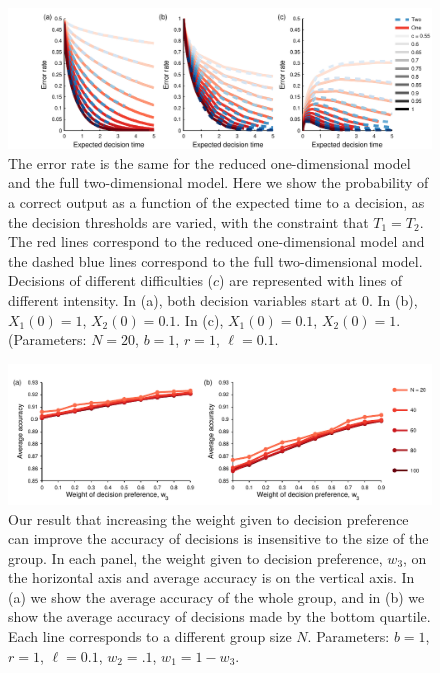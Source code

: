 \documentclass{article}
\begin{document}
\begin{figure}[ht]
\includegraphics[width=6.83in]{dimensionality_comparison.pdf}

\caption{\label{dimensionality} The error rate is the same for the reduced one-dimensional model and the full two-dimensional model. Here we show the probability of a correct output as a function of the expected time to a decision, as the decision thresholds are varied, with the constraint that $T_1=T_2$. The red lines correspond to the reduced one-dimensional model and the dashed blue lines correspond to the full two-dimensional model. Decisions of different difficulties ($c$) are represented with lines of different intensity. In (a), both decision variables start at $0$. In (b), $X_1(0)=1$, $X_2(0)=0.1$. In (c), $X_1(0)=0.1$, $X_2(0)=1$.  (Parameters: $N=20$, $b=1$, $r=1$, $\ell=0.1$.}
\end{figure}

\begin{figure}[ht]
\includegraphics[width=6.83in]{group_size.pdf}
\caption{\label{groupsize} Our result that increasing the weight given to decision preference can improve the accuracy of decisions is insensitive to the size of the group.  In each panel, the weight given to decision preference, $w_3$, on the horizontal axis and average accuracy is on the vertical axis. In (a) we show the average accuracy of the whole group, and in (b) we show the average accuracy of decisions made by the bottom quartile. Each line corresponds to a different group size $N$. Parameters: $b=1$, $r=1$, $\ell=0.1$, $w_2=.1$, $w_1=1-w_3$.}
\end{figure}
\end{document}
